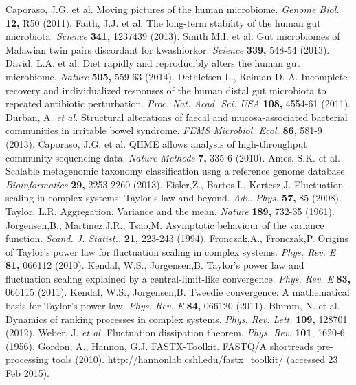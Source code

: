 \documentclass[12pt,oneside,letterpaper]{article}
\begin{document}
\newpage
\begin{thebibliography}{99}
 Caporaso, J.G. et al. Moving pictures of the human microbiome. {\it Genome Biol.} {\bf 12,} R50 (2011).
 Faith, J.J. et al. The long-term stability of the human gut microbiota. {\it Science} {\bf 341,} 1237439 (2013).
 Smith M.I. et al. Gut microbiomes of Malawian twin pairs discordant for kwashiorkor. {\it Science} {\bf 339,} 548-54 (2013).
 David, L.A. et al. Diet rapidly and reproducibly alters the human gut microbiome. {\it Nature} {\bf 505,} 559-63 (2014).
 Dethlefsen L., Relman D. A. Incomplete recovery and individualized responses of the human distal gut microbiota to repeated antibiotic perturbation. {\it Proc. Nat. Acad. Sci. USA} {\bf 108,} 4554-61 (2011).
 Durban, A. \textit{et al.} Structural alterations of faecal and mucosa-associated bacterial communities in irritable bowel syndrome. {\it FEMS Microbiol. Ecol.} {\bf 86}, 581-9 (2013).
 Caporaso, J.G. et al. QIIME allows analysis of high-throughput community sequencing data. {\it Nature Methods} {\bf 7,} 335-6 (2010).
 Ames, S.K. et al. Scalable metagenomic taxonomy classification usng a reference genome database. {\it Bioinformatics} {\bf 29,} 2253-2260 (2013).
 Eisler,Z., Bartos,I., Kertesz,J. Fluctuation scaling in complex systems: Taylor's law and beyond. {\it Adv. Phys.} {\bf 57,} 85 (2008).
 Taylor, L.R. Aggregation, Variance and the mean. {\it Nature} {\bf 189,} 732-35 (1961).
 Jorgensen,B., Martinez,J.R., Tsao,M. Asymptotic behaviour of the variance function. {\it Scand. J. Statist..} {\bf 21,} 223-243 (1994).
 Fronczak,A., Fronczak,P. Origins of Taylor's power law for fluctuation scaling in complex systems. {\it Phys. Rev. E} {\bf 81,} 066112 (2010).
 Kendal, W.S., Jorgensen,B. Taylor's power law and fluctuation scaling explained by a central-limit-like convergence. {\it Phys. Rev. E} {\bf 83,} 066115 (2011).
 Kendal, W.S., Jorgensen,B. Tweedie convergence: A mathematical basis for Taylor's power law. {\it Phys. Rev. E} {\bf 84,} 066120 (2011).
 Blumm, N. et al. Dynamics of ranking processes in complex systems. {\it Phys. Rev. Lett.} {\bf 109,} 128701 (2012).
	 Weber, J. \textit{et al.} Fluctuation dissipation theorem. {\it Phys. Rev.} {\bf 101}, 1620-6 (1956).
	 Gordon, A., Hannon, G.J. FASTX-Toolkit. FASTQ/A shortreads pre-processing tools (2010). http://hannonlab.cshl.edu/fastx\_toolkit/ (accessed 23 Feb 2015).

\end{thebibliography}
\end{document}
